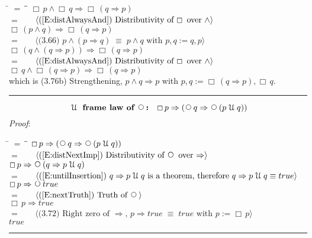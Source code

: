 \documentclass[12pt, fleqn, leqno]{article}
\newcommand{\lgap}{2pt}                             %
\newcommand{\mymathindent}{24pt}                    %
\newcommand{\equivs}{\ensuremath{\;\equiv\;}}       %
\newcommand{\impl}{\ensuremath{\Rightarrow}}        %
\newcommand{\Until}{\;\mathcal{U}\;}
\newcommand{\Next}{\;\,\text{\raisebox{3.5pt}{\circle{6}}}}
\newcommand{\Always}{\Box\,}
\newcommand{\myqed}{\rule[-.23ex]{1.2ex}{2.0ex}}
\newcommand{\myqedtab}{\hspace{384pt}}              %
\newcommand{\Gll} {\langle}                         %
\newcommand{\Ggg} {\rangle}                         %
\newcommand{\Hint}[1]     {\ \ \ $\Gll              \mbox{#1} \Ggg$ }   %
\begin{document}
\begin{tabbing}
\hspace{\mymathindent} \= $= \;$ \= \myqedtab \= \kill
  \> \>   $\Always p \land \Always q \impl \Always (q \impl p)$\\[\lgap]
   \> $=$  \>  \Hint{(\ref{E:distAlwaysAnd}) Distributivity of $\Always$ over $\land$}\\[\lgap]
  \> \>   $\Always (p \land q) \impl \Always (q \impl p)$\\[\lgap]
   \> $=$  \>  \Hint{(3.66) $p\land (p\impl q) \equivs p\land q$ with $p, q := q , p$}\\[\lgap]
  \> \>   $\Always (q \land (q \impl p)) \impl \Always (q \impl p)$\\[\lgap]
    \> $=$  \>  \Hint{(\ref{E:distAlwaysAnd}) Distributivity of $\Always$ over $\land$}\\[\lgap]
  \> \>   $\Always q \land \Always (q \impl p) \impl \Always (q \impl p)$\\[\lgap]
   \> which is (3.76b) Strengthening, $p\land q \impl p$ with $p, q :=\Always (q \impl p) ,\Always q$. \quad \myqed
\end{tabbing}

\begin{equation}\label{E:untilframelawnext}
\textbf{$\Until$ frame law of $\Next$:}\quad \Always p \impl (\Next q \impl \Next (p \Until q))
\end{equation}
\emph{Proof}:
\begin{tabbing}
\hspace{\mymathindent} \= $= \;$ \= \myqedtab \= \kill
	\> \>   $\Always p \impl (\Next q \impl \Next (p \Until q))$\\[\lgap]
	\> $=$  \>  \Hint{(\ref{E:distNextImp}) Distributivity of $\Next$ over $\impl$}\\[\lgap]
	\> \>   $\Always p \impl \Next (q \impl p \Until q)$\\[\lgap]
	\> $=$  \>  \Hint{(\ref{E:untilInsertion}) $q \impl p \Until q$ is a theorem, therefore $q \impl p \Until q \equiv true$}\\[\lgap]
	\> \>   $\Always p \impl \Next true$\\[\lgap]
	\> $=$  \>  \Hint{(\ref{E:nextTruth}) Truth of $\Next$}\\[\lgap]
	\> \>   $\Always p \impl true$\\[\lgap]
	\> $=$  \>  \Hint{(3.72) Right zero of $\impl$, $p\impl true \equivs true$ with $p := \Always p$}\\[\lgap]
	\> \>   $true$ \quad \myqed
\end{tabbing}
\end{document}

